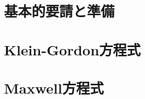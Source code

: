 \documentclass{report}
\begin{document}
  \maketitle
  \tableofcontents
  \chapter{基本的要請と準備}
    
  \chapter{Klein-Gordon方程式}
    
  \chapter{Maxwell方程式}
    
\end{document}
